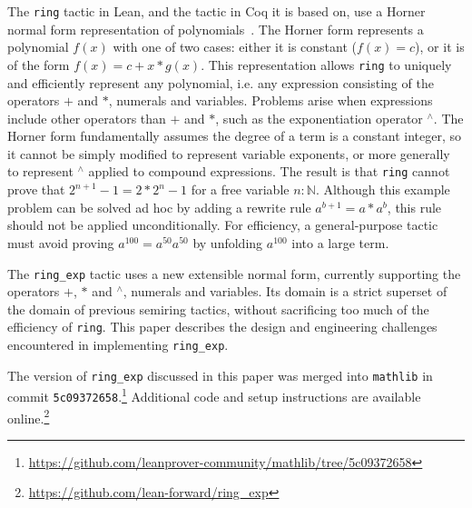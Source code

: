 \documentclass{llncs}
\newcommand{\Q}{\mathbb{Q}}
\newcommand{\lean}[1]{\texttt{#1}\xspace} %
\newcommand{\mathlib}{\texttt{mathlib}\xspace}
\newcommand{\pow}{{${}^\wedge$}\xspace}
\newcommand{\ring}{\lean{ring}}
\newcommand{\ringexp}{\lean{ring\_exp}}
\begin{document}
The \ring tactic in Lean, and the tactic in Coq it is based on,
use a Horner normal form representation of polynomials~\cite{ring-tactic}.
The Horner form represents a polynomial $f(x)$ with one of two cases:
either it is constant ($f(x) = c$), or it is of the form $f(x) = c + x * g(x)$.
This representation
allows \ring to uniquely and efficiently represent any polynomial,
i.e. any expression consisting of the operators $+$ and $*$, numerals and variables.
Problems arise when expressions include other operators than $+$ and $*$, such as the exponentiation operator \pow.
The Horner form fundamentally assumes the degree of a term is a constant integer,
so it cannot be simply modified to represent variable exponents,
or more generally to represent \pow applied to compound expressions.
The result is that \ring cannot prove that $2^{n+1} - 1 = 2 * 2^n - 1$ for a free variable $n : \mathbb{N}$.
Although this example problem can be solved ad hoc by adding a rewrite rule $a^{b+1} = a * a^b$,
this rule should not be applied unconditionally.
For efficiency, a general-purpose tactic must avoid proving $a^{100} = a^{50} a^{50}$ by unfolding $a^{100}$ into a large term.

The \ringexp tactic uses a new extensible normal form, currently supporting the operators $+$, $*$ and \pow, numerals and variables.
Its domain is a strict superset of the domain of previous semiring tactics,
without sacrificing too much of the efficiency of \ring.
This paper describes the design and engineering challenges encountered in implementing \ringexp.

The version of \ringexp discussed in this paper was merged into \mathlib in commit \texttt{5c09372658}.\footnote{\url{https://github.com/leanprover-community/mathlib/tree/5c09372658}}
Additional code and setup instructions are available online.\footnote{\url{https://github.com/lean-forward/ring_exp}}
\end{document}
